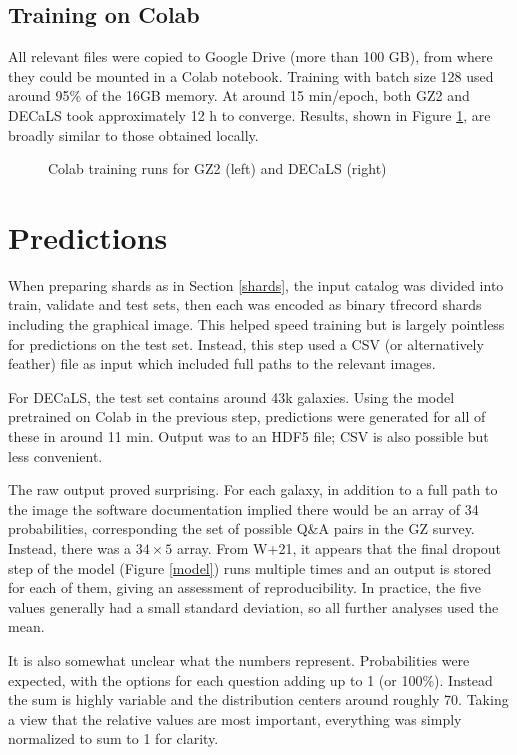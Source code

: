 \documentclass[preprint]{aastex631}
\begin{document}
\subsection{Training on Colab} \label{sec:colabtrain}

All relevant files were copied to Google Drive (more than 100 GB), from where they could be mounted in a Colab notebook. Training with batch size 128 used around 95\% of the 16GB memory. At around 15 min/epoch, both GZ2 and DECaLS took approximately 12 h to converge. Results, shown in Figure \ref{fig:train_colab}, are broadly similar to those obtained locally.

\begin{figure}
	\caption{Colab training runs for GZ2 (left) and DECaLS (right) \label{fig:train_colab}}
\end{figure}


\section{Predictions} \label{sec:predictions}

When preparing shards as in Section \ref{shards}, the input catalog was divided into train, validate and test sets, then each was encoded as binary tfrecord shards including the graphical image. This helped speed training but is largely pointless for predictions on the test set. Instead, this step used a CSV (or alternatively feather) file as input which included full paths to the relevant images.

For DECaLS, the test set contains around 43k galaxies. Using the model pretrained on Colab in the previous step, predictions were generated for all of these in around 11 min. Output was to an HDF5 file; CSV is also possible but less convenient.

The raw output proved surprising. For each galaxy, in addition to a full path to the image the software documentation implied there would be an array of 34 probabilities, corresponding the set of possible Q\&A pairs in the GZ survey. Instead, there was a $34 \times 5$ array. From W+21, it appears that the final dropout step of the model (Figure \ref{model}) runs multiple times and an output is stored for each of them, giving an assessment of reproducibility. In practice, the five values generally had a small standard deviation, so all further analyses used the mean.

It is also somewhat unclear what the numbers represent. Probabilities were expected, with the options for each question adding up to 1 (or  100\%). Instead the sum is highly variable and the distribution centers around roughly 70. Taking a view that the relative values are most important, everything was simply normalized to sum to 1 for clarity. 
\end{document}
